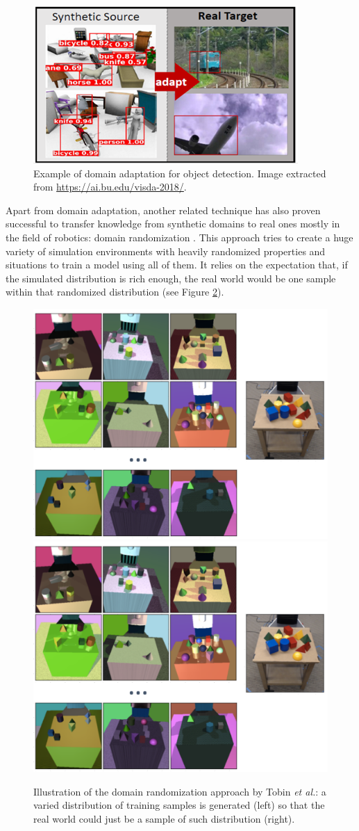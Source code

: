 \begin{figure}[!htb]
	\centering
	\includegraphics[width=0.55\linewidth]{Figures/Sim2Real/domainadapt3.png}
	\caption{Example of domain adaptation for object detection. Image extracted from \url{https://ai.bu.edu/visda-2018/}.}
	\label{fig:sim2real:da3}
\end{figure}

Apart from domain adaptation, another related technique has also proven successful to transfer knowledge from synthetic domains to real ones mostly in the field of robotics: domain randomization \cite{Tremblay2018, Tobin2017, Mehta2019}. This approach tries to create a huge variety of simulation environments with heavily randomized properties and situations to train a model using all of them. It relies on the expectation that, if the simulated distribution is rich enough, the real world would be one sample within that randomized distribution (see Figure \ref{fig:sim2real:dr}).

\begin{figure}[!htb]
    \centering
    \includegraphics[width=0.55\linewidth, clip, trim=0 300 300 0]{Figures/Sim2Real/dr.png}
    \includegraphics[width=0.25\linewidth, clip, trim=720 200 0 0]{Figures/Sim2Real/dr.png}
    \caption{Illustration of the domain randomization approach by Tobin \emph{et al.}\cite{Tobin2017}: a varied distribution of training samples is generated (left) so that the real world could just be a sample of such distribution (right).}
    \label{fig:sim2real:dr}
\end{figure}

